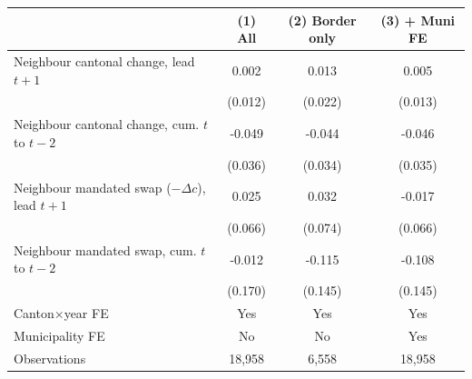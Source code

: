 \begin{tabular}{lccc}
\toprule
 & (1) All & (2) Border only & (3) + Muni FE \\
\midrule
Neighbour cantonal change, lead $t{+}1$ & 0.002 & 0.013 & 0.005 \\
 & (0.012) & (0.022) & (0.013) \\
Neighbour cantonal change, cum. $t$ to $t{-}2$ & -0.049 & -0.044 & -0.046 \\
 & (0.036) & (0.034) & (0.035) \\
Neighbour mandated swap ($-\Delta c$), lead $t{+}1$ & 0.025 & 0.032 & -0.017 \\
 & (0.066) & (0.074) & (0.066) \\
Neighbour mandated swap, cum. $t$ to $t{-}2$ & -0.012 & -0.115 & -0.108 \\
 & (0.170) & (0.145) & (0.145) \\
\midrule
Canton$\times$year FE & Yes & Yes & Yes \\
Municipality FE & No & No & Yes \\
Observations & 18,958 & 6,558 & 18,958 \\
\bottomrule
\end{tabular}